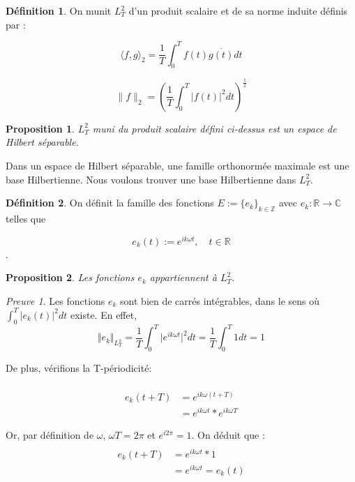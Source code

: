 \documentclass[]{article}
\newtheorem{myproposition}{Proposition}
\theoremstyle{remark}
\newtheorem{myproof}{Preuve}
\theoremstyle{definition}
\newtheorem{mydef}{Définition}
\begin{document}
			\begin{mydef} 
				On munit $L^2_T$ d'un produit scalaire et de sa norme induite définis par : 
			
			
				$$ \langle f,g \rangle_2 = \frac{1}{T} \int_{0}^{T} f(t) \overline{g(t)} dt$$
				
				$$ \| f \|_2 =  \left(\frac{1}{T} \int_0^T | f(t) |^2 dt\right)^{\frac{1}{2}}$$	
				
			\end{mydef}
			
			\begin{myproposition}
				$L^2_T$ muni du produit scalaire défini ci-dessus est un espace de Hilbert séparable.
			\end{myproposition}
		 
			
			Dans un espace de Hilbert séparable, une famille orthonormée maximale est une base Hilbertienne. Nous voulons trouver une base Hilbertienne dans $L_T^2$.
			
			\begin{mydef}
				On définit la famille des fonctions $E:= \{e_k\}_{k \in \mathbb{Z}}$ avec $e_k:\mathbb{R} \to \mathbb{C}$ telles que
				
				$$e_k(t):=e^{ik\omega t}, \quad t\in \mathbb{R}$$.	
			\end{mydef}
			
			
			\begin{myproposition}
				Les fonctions $e_k$ appartiennent à $L^2_T$. 
			\end{myproposition}
			
			\begin{myproof}
				Les fonctions $e_k$ sont bien de carrés intégrables, dans le sens où $\int_0^T \vert e_k(t)\vert ^2 dt$ existe. En effet, 
				$$ \Vert e_k \Vert_{L_T^2} = \frac{1}{T}  \int_0^T \vert e^{ik\omega t} \vert ^2dt =  \frac{1}{T}  \int_0^T 1 dt = 1 $$
				
				
				De plus, vérifions la T-périodicité: 
				
				\begin{align*}
				\\ e_k(t+T) &= e^{ik\omega(t+T)}
				\\ & = e^{ik\omega t} * e^{ik\omega T}
				\end{align*}
				
				Or, par définition de $\omega$, $\omega T = 2\pi$ et $e^{i2\pi}= 1$. On déduit que : 
				\begin{align*}
				\\ e_k(t+T) &= e^{ik\omega t}*1 
				\\ &= e^{ik\omega t} = e_k(t) 
				\end{align*}
				
			\end{myproof}
			
\end{document}
